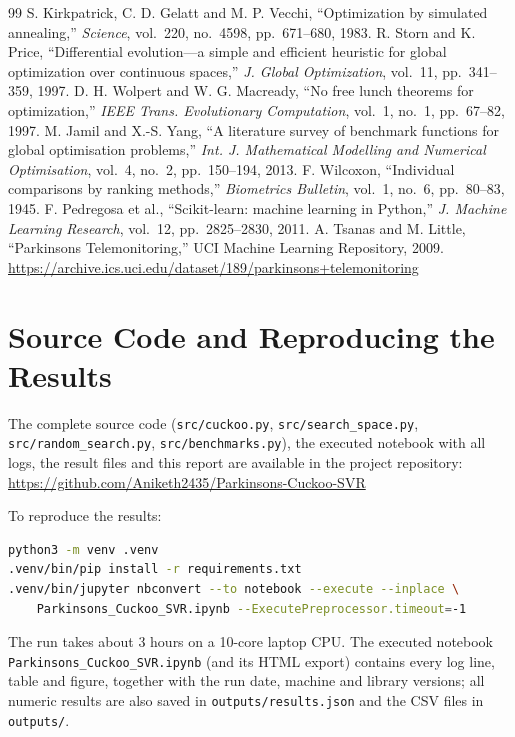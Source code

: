 \documentclass[12pt,a4paper]{article}
\newcommand{\RepoURL}{https://github.com/Aniketh2435/Parkinsons-Cuckoo-SVR}
\numberwithin{equation}{section}
\numberwithin{table}{section}
\numberwithin{figure}{section}
\begin{document}
\begin{thebibliography}{99}
 S. Kirkpatrick, C. D. Gelatt and M. P. Vecchi, ``Optimization by simulated annealing,'' \emph{Science}, vol.\ 220, no.\ 4598, pp.\ 671--680, 1983.
 R. Storn and K. Price, ``Differential evolution---a simple and efficient heuristic for global optimization over continuous spaces,'' \emph{J. Global Optimization}, vol.\ 11, pp.\ 341--359, 1997.
 D. H. Wolpert and W. G. Macready, ``No free lunch theorems for optimization,'' \emph{IEEE Trans. Evolutionary Computation}, vol.\ 1, no.\ 1, pp.\ 67--82, 1997.
 M. Jamil and X.-S. Yang, ``A literature survey of benchmark functions for global optimisation problems,'' \emph{Int. J. Mathematical Modelling and Numerical Optimisation}, vol.\ 4, no.\ 2, pp.\ 150--194, 2013.
 F. Wilcoxon, ``Individual comparisons by ranking methods,'' \emph{Biometrics Bulletin}, vol.\ 1, no.\ 6, pp.\ 80--83, 1945.
 F. Pedregosa et al., ``Scikit-learn: machine learning in Python,'' \emph{J. Machine Learning Research}, vol.\ 12, pp.\ 2825--2830, 2011.
 A. Tsanas and M. Little, ``Parkinsons Telemonitoring,'' UCI Machine Learning Repository, 2009.\\ \url{https://archive.ics.uci.edu/dataset/189/parkinsons+telemonitoring}
\end{thebibliography}

\appendix
\section{Source Code and Reproducing the Results}\label{app:code}
{\sloppy The complete source code (\texttt{src/cuckoo.py}, \texttt{src/search\_space.py}, \texttt{src/random\_search.py}, \texttt{src/benchmarks.py}), the executed notebook with all logs, the result files and this report are available in the project repository:\\
{\small\url{\RepoURL}}\par}

\noindent To reproduce the results:

\begin{lstlisting}[language=bash,numbers=none]
python3 -m venv .venv
.venv/bin/pip install -r requirements.txt
.venv/bin/jupyter nbconvert --to notebook --execute --inplace \
    Parkinsons_Cuckoo_SVR.ipynb --ExecutePreprocessor.timeout=-1
\end{lstlisting}
The run takes about 3 hours on a 10-core laptop CPU. The executed notebook\\ \texttt{Parkinsons\_Cuckoo\_SVR.ipynb} (and its HTML export) contains every log line, table and figure, together with the run date, machine and library versions; all numeric results are also saved in \texttt{outputs/results.json} and the CSV files in \texttt{outputs/}.
\end{document}
